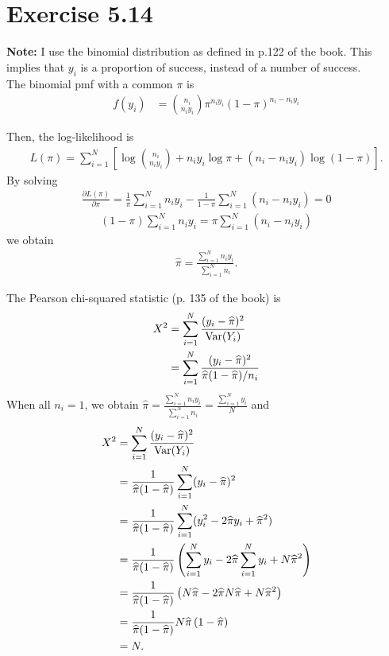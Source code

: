 \section*{Exercise 5.14}
\textbf{Note:} I use the binomial distribution as defined in p.122 of the book. This implies that $y_{i}$ is a proportion of success, instead of a number of success.\\

The binomial pmf with a common $\pi$ is
\begin{align*}
f(y_{i}) &= \binom{n_{i}}{n_{i}y_{i}} \pi^{n_{i}y_{i}} (1-\pi)^{n_{i}-n_{i}y_{i}}
\end{align*}

Then, the log-likelihood is
\begin{align*}
L(\pi) = \sum_{i=1}^{N} \left[\log\binom{n_{i}}{n_{i}y_i} + n_{i}y_{i}\log\pi + (n_{i} -n_{i}y_{i})\log(1-\pi)\right].
\end{align*}
By solving
\begin{align*}
\frac{\partial L(\pi)}{\partial \pi} =  \frac{1}{\pi}\sum_{i=1}^{N}n_{i}y_{i} -\frac{1}{1-\pi}\sum_{i=1}^{N}(n_{i}-n_{i}y_{i}) = 0
\end{align*}
\begin{align*}
(1-\pi)\sum_{i=1}^{N}n_{i}y_{i}  = \pi\sum_{i=1}^{N}(n_{i}-n_{i}y_{i})
\end{align*}
we obtain
\begin{align*}
\widehat{\pi} = \frac{\sum_{i=1}^{N}n_{i}y_{i}}{\sum_{i=1}^{N}n_{i}}.
\end{align*}

The Pearson chi-squared statistic (p. 135 of the book) is
\begin{align*}
X^{2} &= \sum_{i=1}^{N} \frac{(y_{i} - \widehat{\pi})^{2}}{\mathrm{Var}(Y_{i})}\\
&= \sum_{i=1}^{N} \frac{(y_{i} - \widehat{\pi})^{2}}{\widehat{\pi}(1-\widehat{\pi})/n_{i}}
\end{align*}
When all $n_{i} = 1$, we obtain $\widehat{\pi} = \frac{\sum_{i=1}^{N}n_{i}y_{i}}{\sum_{i=1}^{N}n_{i}} = \frac{\sum_{i=1}^{N}y_{i}}{N}$ and
\begin{align*}
X^{2} &= \sum_{i=1}^{N} \frac{(y_{i} - \widehat{\pi})^{2}}{\mathrm{Var}(Y_{i})}\\
&= \frac{1}{\widehat{\pi}(1-\widehat{\pi})}\sum_{i=1}^{N}(y_{i} - \widehat{\pi})^{2}\\
&= \frac{1}{\widehat{\pi}(1-\widehat{\pi})}\sum_{i=1}^{N}(y_{i}^{2} -2\widehat{\pi}y_{i} + \widehat{\pi}^{2})\\
&= \frac{1}{\widehat{\pi}(1-\widehat{\pi})}\left(\sum_{i=1}^{N}y_{i} -2\widehat{\pi}\sum_{i=1}^{N}y_{i} +N\widehat{\pi}^{2}\right)\\
&= \frac{1}{\widehat{\pi}(1-\widehat{\pi})}\left(N\widehat{\pi} -2\widehat{\pi}N\widehat{\pi} +N\widehat{\pi}^{2}\right)\\
&= \frac{1}{\widehat{\pi}(1-\widehat{\pi})}N\widehat{\pi}\left(1 -\widehat{\pi}\right)\\
&= N.
\end{align*}
